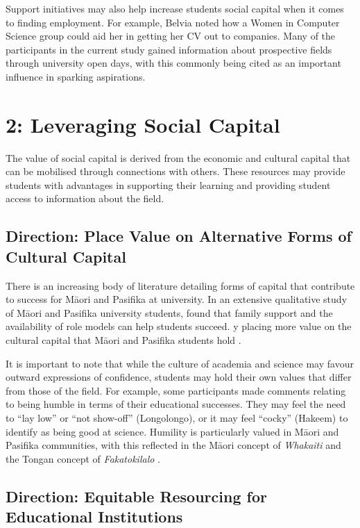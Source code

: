 Support initiatives may also help increase students social capital when it comes to finding employment. For example, Belvia noted how a Women in Computer Science group could aid her in getting her CV out to companies. Many of the participants in the current study gained information about prospective fields through university open days, with this commonly being cited as an important influence in sparking aspirations. 

\section{2: Leveraging Social Capital}
The value of social capital is derived from the economic and cultural capital that can be mobilised through connections with others. These resources may provide students with advantages in supporting their learning and providing student access to information about the field. 

\subsection{Direction: Place Value on Alternative Forms of Cultural Capital}

There is an increasing body of literature detailing forms of capital that contribute to success for M\={a}ori and Pasifika at university. In an extensive qualitative study of M\={a}ori and Pasifika university students, \citep{mayeda2014you} found that family support and the availability of role models can help students succeed. y placing more value on the cultural capital that M\={a}ori and Pasifika students hold \cite{bishop2009te}.

It is important to note that while the culture of academia and science may favour outward expressions of confidence, students may hold their own values that differ from those of the field. For example, some participants made comments relating to being humble in terms of their educational successes. They may feel the need to ``lay low'' or ``not show-off'' (Longolongo), or it may feel ``cocky'' (Hakeem) to identify as being good at science. Humility is particularly valued in M\={a}ori and Pasifika communities, with this reflected in the M\={a}ori concept of \textit{Whakaiti} \cite{haar2018indigenous} and the Tongan concept of \textit{Fakatokilalo} \cite{mafile2004exploring}. 

\subsection{Direction: Equitable Resourcing for Educational Institutions}

